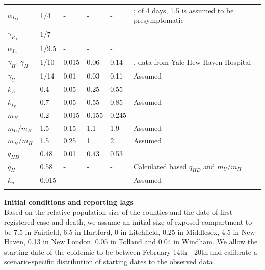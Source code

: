 \documentclass[11pt]{article}
\begin{document}
\begin{spacing}{.9}
\begin{longtable}[H] {p{} p{} p{} p{} p{} p{} }
		$\alpha_{I_M}$ & 1/4 & {-} & {-} & {-} & \citep{salje2020estimating, li2020substantial, kissler2020projecting}; of 4 days, 1.5 is assumed to be presymptomatic \citep{wei2020presymptomatic} \\[0.5em]
		$\gamma_{R_M}$ & 1/7 & {-} & {-} & {-} & \citep{wolfel2020virological, cdc2020isolation} \\[0.5em]
		$\alpha_{I_S}$ & 1/9.5 & {-} & {-} & {-} & \citep{verity2020estimates, lewnard2020incidence} \\[0.5em]
		$\gamma_H$, $\gamma_{\bar{H}}$ & 1/10 & 0.015 & 0.06 & 0.14 & \citep{lewnard2020incidence, paranjpe2020clinical}, data from Yale Hew Haven Hospital \\[0.5em]
		$\gamma_U$ & 1/14 & 0.01 & 0.03 & 0.11 & Assumed \\[0.5em]
		$k_A$ & 0.4 & 0.05 & 0.25 & 0.55 & \citep{salomon2020defining, ferguson2020impact} \\[0.5em]
		$k_{I_S}$ &  0.7 & 0.05 & 0.55 & 0.85 & Assumed \\[0.5em]
		$m_H$ & 0.2 & 0.015 & 0.155 & 0.245 & \citep{lewnard2020incidence, paranjpe2020clinical, petrilli2020factors, verity2020estimates, CHAwebsite} \\[0.5em]
		$m_U / m_H$ & 1.5 & 0.15 & 1.1 & 1.9 & Assumed \\[0.5em]
		$m_{\bar{H}} / m_H$ & 1.5 & 0.25 & 1 & 2 & Assumed \\[0.5em]
		$q_{HD}$ & 0.48 & 0.01 & 0.43 & 0.53 & \citep{CHAwebsite, DPHwebsite} \\[0.5em]		
		$q_H$ & 0.58 & {-} & {-} & {-} & {Calculated based $q_{HD}$ and $m_U/m_H$} \\[0.5em]
		$k_n$ & 0.015 & {-} & {-} & {-} & Assumed \\[0.5em]
		\hline
	\label{table:priors}
	\end{longtable}
\end{spacing}


\textbf{Initial conditions and reporting lags}\\[0.5em]
Based on the relative population size of the counties and the date of first registered case and death, we assume an initial size of exposed compartment to be 7.5 in Fairfield, 6.5 in Hartford, 0 in Litchfield, 0.25 in Middlesex, 4.5 in New Haven, 0.13 in New London, 0.05 in Tolland and 0.04 in Windham. We allow the starting date of the epidemic to be between February 14th - 20th and calibrate a scenario-specific distribution of starting dates to the observed data. 
\end{document}

